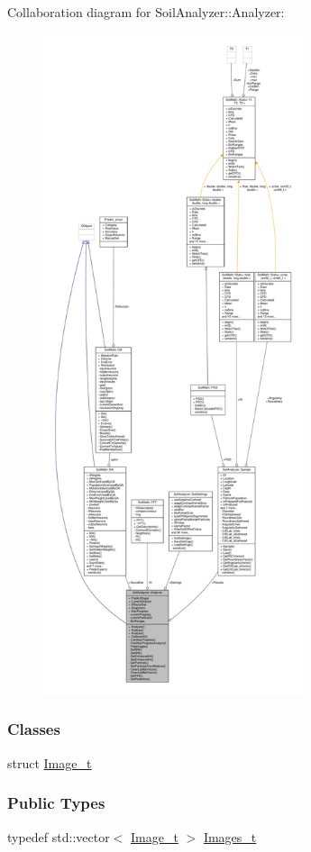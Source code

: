 Collaboration diagram for Soil\+Analyzer\+:\+:Analyzer\+:
\nopagebreak
\begin{figure}[H]
\begin{center}
\leavevmode
\includegraphics[height=550pt]{class_soil_analyzer_1_1_analyzer__coll__graph}
\end{center}
\end{figure}
\subsubsection*{Classes}
\begin{DoxyCompactItemize}
\item 
struct \hyperlink{struct_soil_analyzer_1_1_analyzer_1_1_image__t}{Image\+\_\+t}
\end{DoxyCompactItemize}
\subsubsection*{Public Types}
\begin{DoxyCompactItemize}
\item 
typedef std\+::vector$<$ \hyperlink{struct_soil_analyzer_1_1_analyzer_1_1_image__t}{Image\+\_\+t} $>$ \hyperlink{class_soil_analyzer_1_1_analyzer_a55e2c84ab42cb967d718dd18295c1f91}{Images\+\_\+t}
\end{DoxyCompactItemize}
